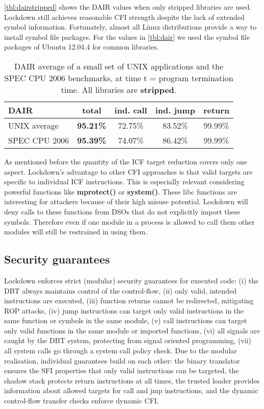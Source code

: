 \documentclass{acm_proc_article-sp}
\begin{document}
\autoref{tbl:dairstripped} shows the DAIR values when only stripped libraries are used.
Lockdown still achieves reasonable CFI strength despite the lack of extended
symbol information. Fortunately, almost all Linux distributions provide a way to
install symbol file packages. For the values in \autoref{tbl:dair} we used the
symbol file packages of Ubuntu 12.04.4 for common libraries.

\begin{table*}[t!]
\begin{center}
\begin{tabular}{  l | c || c | c | c }
     DAIR & {\bf total } & ind. call & ind. jump & return \\ \hline
     UNIX average & {\bf 95.21\% } & 72.75\% & 83.52\% & 99.99\% \\
     SPEC CPU 2006 & {\bf 95.39\% } & 74.07\% & 86.42\% & 99.99\% \\
    \end{tabular}
    \caption{DAIR average of a small set of UNIX applications and the SPEC CPU 2006 benchmarks, at time t = program
    termination time. All libraries are {\bf stripped}. }
	\label{tbl:dairstripped}
\end{center}
\end{table*}

As mentioned before the quantity of the ICF target reduction covers only one aspect.
Lockdown's advantage to other CFI approaches is that valid targets are specific
to individual ICF instructions. This is especially relevant considering powerful functions
like {\bf mprotect()} or {\bf system()}. These libc functions are interesting for
attackers because of their high misuse potential. Lockdown will deny calls to these
functions from DSOs that do not explicitly import these symbols. Therefore even if one
module in a process is allowed to call them other modules will still be restrained in
using them.




\subsection{Security guarantees}


Lockdown enforces strict (modular) security guarantees for executed code: (i)
the DBT always maintains control of the control-flow, (ii) only valid, intended
instructions are executed, (iii) function returns cannot be redirected,
mitigating ROP attacks, (iv) jump instructions can target only valid
instructions in the same function or symbols in the same module, (v) call
instructions can target only valid functions in the same module or imported
functions, (vi) all signals are caught by the DBT system, protecting from signal
oriented programming, (vii) all system calls go through a system call policy
check.  Due to the modular realisation, individual guarantees build on each
other: the binary translator ensures the SFI properties that only valid
instructions can be targeted, the shadow stack protects return instructions at
all times, the trusted loader provides information about allowed targets for
call and jmp instructions, and the dynamic control-flow transfer checks enforce
dynamic CFI.
\end{document}
